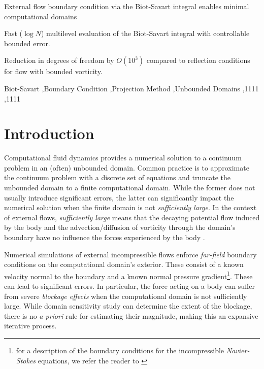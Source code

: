 \documentclass[preprint,12pt]{elsarticle}
\begin{document}
\begin{frontmatter}
\begin{highlights}
\item External flow boundary condition via the Biot-Savart integral enables minimal computational domains
\item Fast ($\log N$) multilevel evaluation of the Biot-Savart integral with controllable bounded error.
\item Reduction in degrees of freedom by $O(10^3)$ compared to reflection conditions for flow with bounded vorticity. 
\end{highlights}

\begin{keyword}
Biot-Savart \sep Boundary Condition \sep Projection Method \sep Unbounded Domains
 \sep 1111
 \sep 1111
\end{keyword}

\end{frontmatter}



\section{Introduction}
Computational fluid dynamics provides a numerical solution to a continuum problem in an (often) unbounded domain. Common practice is to approximate the continuum problem with a discrete set of equations and truncate the unbounded domain to a finite computational domain. 
While the former does not usually introduce significant errors, the latter can significantly impact the numerical solution when the finite domain is not \emph{sufficiently large}. In the context of external flows, \emph{sufficiently large} means that the decaying potential flow induced by the body and the advection/diffusion of vorticity through the domain's boundary have no influence the forces experienced by the body \cite{Colonius2008}.

Numerical simulations of external incompressible flows enforce \emph{far-field} boundary conditions on the computational domain's exterior. These consist of a known velocity normal to the boundary and a known normal pressure gradient\footnote{for a description of the boundary conditions for the incompressible \emph{Navier-Stokes} equations, we refer the reader to \cite{Gresho1987}}. These can lead to significant errors. In particular, the force acting on a body can suffer from severe \emph{blockage effects} when the computational domain is not sufficiently large. While domain sensitivity study can determine the extent of the blockage, there is no \emph{a priori} rule for estimating their magnitude, making this an expansive iterative process.
\end{document}
